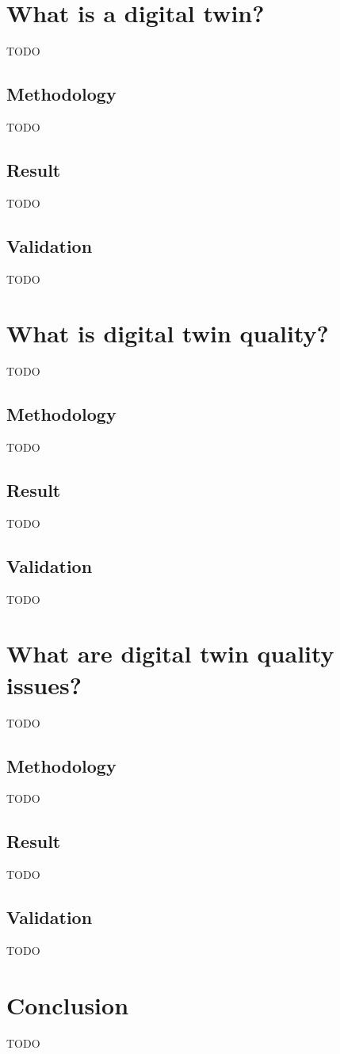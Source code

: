 \documentclass[conference]{IEEEtran}
\begin{document}
    \section{What is a digital twin?}
    TODO

    \subsection{Methodology}
    TODO

    \subsection{Result}
    TODO

    \subsection{Validation}
    TODO

    \section{What is digital twin quality?}
    TODO

    \subsection{Methodology}
    TODO

    \subsection{Result}
    TODO

    \subsection{Validation}
    TODO

    \section{What are digital twin quality issues?}
    TODO

    \subsection{Methodology}
    TODO

    \subsection{Result}
    TODO

    \subsection{Validation}
    TODO

    \section{Conclusion}
    \label{section:conclusion}
    TODO

    
    
\end{document}
